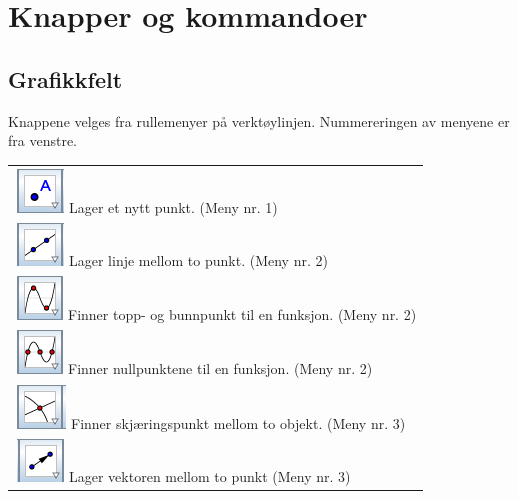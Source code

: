 




	
	
	
\section{Knapper og kommandoer}
\subsection*{Grafikkfelt}
Knappene velges fra rullemenyer på verktøylinjen. Nummereringen av menyene er fra venstre.\vsk

\begin{tabular}{@{}l}
	\,\includegraphics[scale=0.4]{fig/pkt} Lager et nytt punkt. (Meny nr. 1) \\
	\,\includegraphics[scale=0.4]{fig/lin} Lager linje mellom to punkt. (Meny nr. 2)\\	
	\,\includegraphics[scale=0.4]{fig/ekst} Finner topp- og bunnpunkt til en funksjon. (Meny nr. 2)\\
	\,\includegraphics[scale=0.4]{fig/nul} Finner nullpunktene til en funksjon. (Meny nr. 2)	\\
	\,\includegraphics[scale=0.4]{fig/skj} Finner skjæringspunkt mellom to objekt. (Meny nr. 3)\\	
	\,\includegraphics[scale=0.4]{fig/vek} Lager vektoren mellom to punkt (Meny nr. 3)\\		

\end{tabular}
